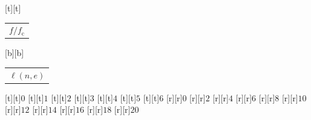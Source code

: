 %    
%
%
\begin{psfrags}%
\psfragscanon%
%
[t][t]{\color[rgb]{0,0,0}\setlength{\tabcolsep}{0pt}\begin{tabular}{c}{\Large $f/f_\mathrm{c}$}\end{tabular}}%
[b][b]{\color[rgb]{0,0,0}\setlength{\tabcolsep}{0pt}\begin{tabular}{c}{\Large $\ell(n,e)$}\end{tabular}}%
%
[t][t]{$0$}%
[t][t]{$1$}%
[t][t]{$2$}%
[t][t]{$3$}%
[t][t]{$4$}%
[t][t]{$5$}%
[t][t]{$6$}%
%
[r][r]{$0$}%
[r][r]{$2$}%
[r][r]{$4$}%
[r][r]{$6$}%
[r][r]{$8$}%
[r][r]{$10$}%
[r][r]{$12$}%
[r][r]{$14$}%
[r][r]{$16$}%
[r][r]{$18$}%
[r][r]{$20$}%
%
%
\end{psfrags}%
%
